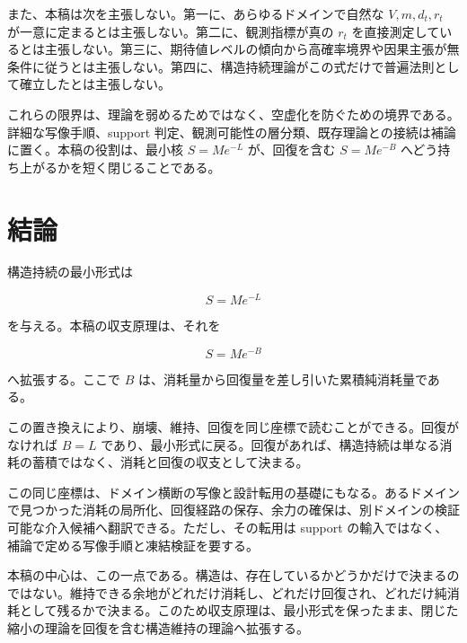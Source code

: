 \documentclass[12pt,a4paper]{article}
\begin{document}
また、本稿は次を主張しない。第一に、あらゆるドメインで自然な \(V,m,d_{t},r_{t}\) が一意に定まるとは主張しない。第二に、観測指標が真の \(r_{t}\) を直接測定しているとは主張しない。第三に、期待値レベルの傾向から高確率境界や因果主張が無条件に従うとは主張しない。第四に、構造持続理論がこの式だけで普遍法則として確立したとは主張しない。

これらの限界は、理論を弱めるためではなく、空虚化を防ぐための境界である。詳細な写像手順、support 判定、観測可能性の層分類、既存理論との接続は補論に置く。本稿の役割は、最小核 \(S=Me^{-L}\) が、回復を含む \(S=Me^{-B}\) へどう持ち上がるかを短く閉じることである。

\section{結論}\label{ux7d50ux8ad6}

構造持続の最小形式は

\[
S = M e^{-L}
\]

を与える。本稿の収支原理は、それを

\[
S = M e^{-B}
\]

へ拡張する。ここで \(B\) は、消耗量から回復量を差し引いた累積純消耗量である。

この置き換えにより、崩壊、維持、回復を同じ座標で読むことができる。回復がなければ \(B=L\) であり、最小形式に戻る。回復があれば、構造持続は単なる消耗の蓄積ではなく、消耗と回復の収支として決まる。

この同じ座標は、ドメイン横断の写像と設計転用の基礎にもなる。あるドメインで見つかった消耗の局所化、回復経路の保存、余力の確保は、別ドメインの検証可能な介入候補へ翻訳できる。ただし、その転用は support の輸入ではなく、補論で定める写像手順と凍結検証を要する。

本稿の中心は、この一点である。構造は、存在しているかどうかだけで決まるのではない。維持できる余地がどれだけ消耗し、どれだけ回復され、どれだけ純消耗として残るかで決まる。このため収支原理は、最小形式を保ったまま、閉じた縮小の理論を回復を含む構造維持の理論へ拡張する。
\end{document}
